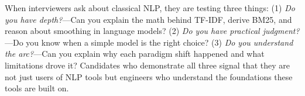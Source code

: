 \bigskip

\begin{keyinsight}
When interviewers ask about classical NLP, they are testing three things: (1) \emph{Do you
have depth?}---Can you explain the math behind TF-IDF, derive BM25, and reason about
smoothing in language models? (2) \emph{Do you have practical judgment?}---Do you know when
a simple model is the right choice? (3) \emph{Do you understand the arc?}---Can you explain
why each paradigm shift happened and what limitations drove it? Candidates who demonstrate
all three signal that they are not just users of NLP tools but engineers who understand the
foundations these tools are built on.
\end{keyinsight}
